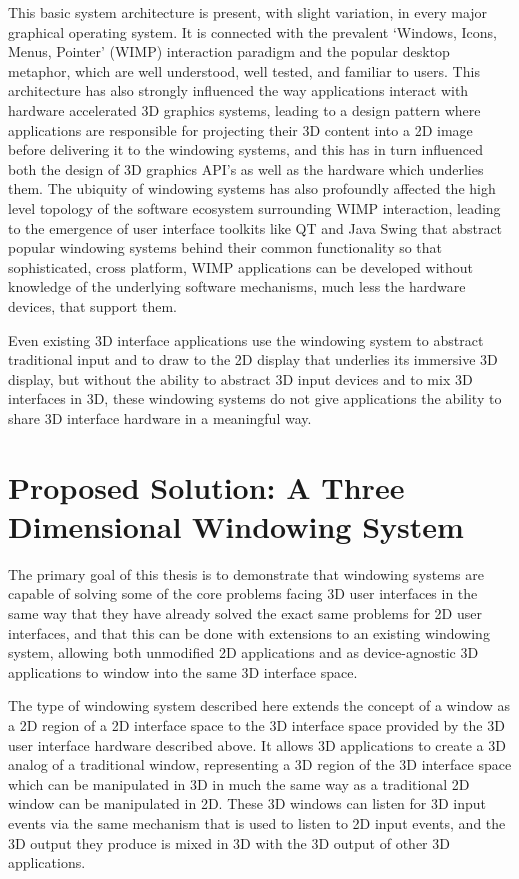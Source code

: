 This basic system architecture is present, with slight variation, in every major graphical operating system. It is connected with the prevalent `Windows, Icons, Menus, Pointer' (WIMP) interaction paradigm and the popular desktop metaphor, which are well understood, well tested, and familiar to users. This architecture has also strongly influenced the way applications interact with hardware accelerated 3D graphics systems, leading to a design pattern where applications are responsible for projecting their 3D content into a 2D image before delivering it to the windowing systems, and this has in turn influenced both the design of 3D graphics API's as well as the hardware which underlies them. The ubiquity of windowing systems has also profoundly affected the high level topology of the software ecosystem surrounding WIMP interaction, leading to the emergence of user interface toolkits like QT and Java Swing that abstract popular windowing systems behind their common functionality so that sophisticated, cross platform, WIMP applications can be developed without knowledge of the underlying software mechanisms, much less the hardware devices, that support them.
 
Even existing 3D interface applications use the windowing system to abstract traditional input and to draw to the 2D display that underlies its immersive 3D display, but without the ability to abstract 3D input devices and to mix 3D interfaces in 3D, these windowing systems do not give applications the ability to share 3D interface hardware in a meaningful way.

\section{Proposed Solution: A Three Dimensional Windowing System}

The primary goal of this thesis is to demonstrate that windowing systems are capable of solving some of the core problems facing 3D user interfaces in the same way that they have already solved the exact same problems for 2D user interfaces, and that this can be done with extensions to an existing windowing system, allowing both unmodified 2D applications and as device-agnostic 3D applications to window into the same 3D interface space. 

The type of windowing system described here extends the concept of a window as a 2D region of a 2D interface space to the 3D interface space provided by the 3D user interface hardware described above. It allows 3D applications to create a 3D analog of a traditional window, representing a 3D region of the 3D interface space which can be manipulated in 3D in much the same way as a traditional 2D window can be manipulated in 2D. These 3D windows can listen for 3D input events via the same mechanism that is used to listen to 2D input events, and the 3D output they produce is mixed in 3D with the 3D output of other 3D applications.


